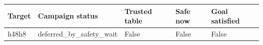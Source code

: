{\small
\begin{tabular}{lllll}
\hline
Target & Campaign status & Trusted table & Safe now & Goal satisfied \\
\hline
h48h8 & deferred\_by\_safety\_wait & False & False & False \\
\hline
\end{tabular}
}
